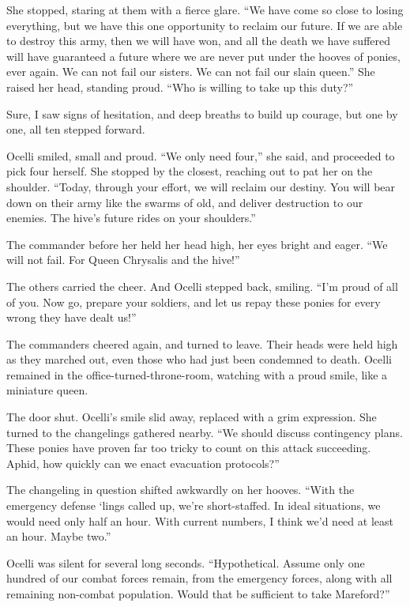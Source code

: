 She stopped, staring at them with a fierce glare. “We have come so close to losing everything, but we have this one opportunity to reclaim our future. If we are able to destroy this army, then we will have won, and all the death we have suffered will have guaranteed a future where we are never put under the hooves of ponies, ever again. We can not fail our sisters. We can not fail our slain queen.” She raised her head, standing proud. “Who is willing to take up this duty?”

Sure, I saw signs of hesitation, and deep breaths to build up courage, but one by one, all ten stepped forward.

Ocelli smiled, small and proud. “We only need four,” she said, and proceeded to pick four herself. She stopped by the closest, reaching out to pat her on the shoulder. “Today, through your effort, we will reclaim our destiny. You will bear down on their army like the swarms of old, and deliver destruction to our enemies. The hive’s future rides on your shoulders.”

The commander before her held her head high, her eyes bright and eager. “We will not fail. For Queen Chrysalis and the hive!”

The others carried the cheer. And Ocelli stepped back, smiling. “I’m proud of all of you. Now go, prepare your soldiers, and let us repay these ponies for every wrong they have dealt us!”

The commanders cheered again, and turned to leave. Their heads were held high as they marched out, even those who had just been condemned to death. Ocelli remained in the office-turned-throne-room, watching with a proud smile, like a miniature queen.

The door shut. Ocelli’s smile slid away, replaced with a grim expression. She turned to the changelings gathered nearby. “We should discuss contingency plans. These ponies have proven far too tricky to count on this attack succeeding. Aphid, how quickly can we enact evacuation protocols?”

The changeling in question shifted awkwardly on her hooves. “With the emergency defense ‘lings called up, we’re short-staffed. In ideal situations, we would need only half an hour. With current numbers, I think we’d need at least an hour. Maybe two.”

Ocelli was silent for several long seconds. “Hypothetical. Assume only one hundred of our combat forces remain, from the emergency forces, along with all remaining non-combat population. Would that be sufficient to take Mareford?”


